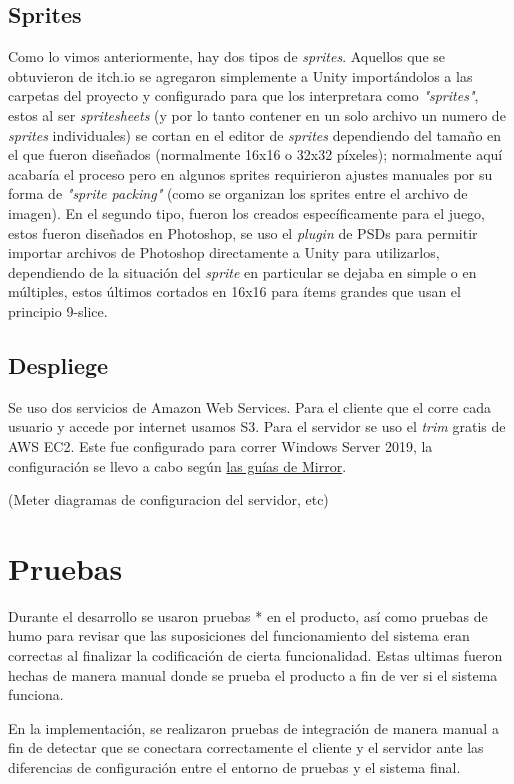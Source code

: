 \subsection{Sprites}
Como lo vimos anteriormente, hay dos tipos de \textit{sprites}. Aquellos que se obtuvieron de itch.io se agregaron simplemente a Unity importándolos a las carpetas del proyecto y configurado para que los interpretara como \textit{"sprites"}, estos al ser \textit{spritesheets} (y por lo tanto contener en un solo archivo un numero de \textit{sprites} individuales) se cortan en el editor de \textit{sprites} dependiendo del tamaño en el que fueron diseñados (normalmente 16x16 o 32x32 píxeles); normalmente aquí acabaría el proceso pero en algunos sprites requirieron ajustes manuales por su forma de \textit{"sprite packing"} (como se organizan los sprites entre el archivo de imagen). En el segundo tipo, fueron los creados específicamente para el juego, estos fueron diseñados en Photoshop, se uso el \textit{plugin} de PSDs para permitir importar archivos de Photoshop directamente a Unity para utilizarlos, dependiendo de la situación del \textit{sprite} en particular se dejaba en simple o en múltiples, estos últimos cortados en  16x16 para ítems grandes que usan el principio 9-slice. 

\subsection{Despliege}
Se uso dos servicios de Amazon Web Services. 
Para el cliente que el corre cada usuario y accede por internet usamos S3.
Para el servidor se uso el \textit{trim} gratis de AWS EC2. Este fue configurado para correr Windows Server 2019, la configuración se llevo a cabo según \href{https://mirror-networking.gitbook.io/docs/guides/server-hosting/aws}{las guías de Mirror}.

(Meter diagramas de configuracion del servidor, etc)

\section{Pruebas}
Durante el desarrollo se usaron pruebas * en el producto, así como pruebas de humo para revisar que las suposiciones del funcionamiento del sistema eran correctas al finalizar la codificación de cierta funcionalidad. Estas ultimas fueron hechas de manera manual donde se prueba el producto a fin de ver si el sistema funciona.

En la implementación, se realizaron pruebas de integración de manera manual a fin de detectar que se conectara correctamente el cliente y el servidor ante las diferencias de configuración entre el entorno de pruebas y el sistema final.